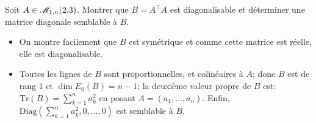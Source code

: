 \begin{exercice}
    Soit $A \in \mathscr{M}_{1,n} (2.3)$. Montrer que $B = A^\top A$ est diagonalisable et déterminer une matrice diagonale semblable à $B$.
\end{exercice}

\begin{solution}
    \begin{itemize}
        \item On montre facilement que $B$ est symétrique et comme cette matrice est réelle, elle est diagonalisable.
        \item Toutes les lignes de $B$ sont proportionnelles, et colinéaires à $A$; donc $B$ est de rang $1$ et $\dim E_0(B) = n-1$; la deuxième valeur propre de $B$ est: $\mathrm{Tr}(B) = \sum\limits_{k = 1}^{n} a_k^2$ en posant $A = (a_1, \dots, a_n)$. Enfin, $\mathrm{Diag} \left(\sum\limits_{k = 1}^{n} a_k^2, 0, \dots, 0 \right)$ est semblable à $B$.
    \end{itemize}
\end{solution}

